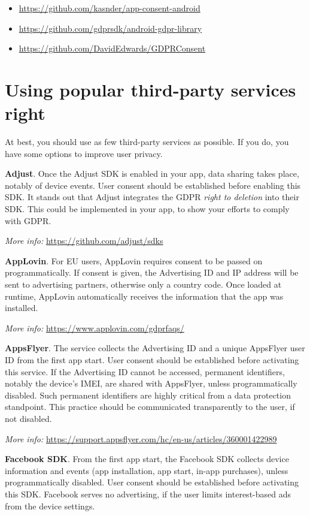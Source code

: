 \documentclass[
]{book}
\providecommand{\tightlist}{%
  \setlength{\itemsep}{0pt}\setlength{\parskip}{0pt}}
\begin{document}
\begin{itemize}
\tightlist
\item
  \url{https://github.com/kasnder/app-consent-android}
\item
  \url{https://github.com/gdprsdk/android-gdpr-library}
\item
  \url{https://github.com/DavidEdwards/GDPRConsent}
\end{itemize}

\hypertarget{using-popular-third-party-services-right}{%
\section{Using popular third-party services right}\label{using-popular-third-party-services-right}}

At best, you should use as few third-party services as possible. If you do, you have some options to improve user privacy.

\textbf{Adjust}. Once the Adjust SDK is enabled in your app, data sharing takes place, notably of device events. User consent should be established before enabling this SDK. It stands out that Adjust integrates the GDPR \emph{right to deletion} into their SDK. This could be implemented in your app, to show your efforts to comply with GDPR.

\emph{More info:} \url{https://github.com/adjust/sdks}

\textbf{AppLovin}. For EU users, AppLovin requires consent to be passed on programmatically. If consent is given, the Advertising ID and IP address will be sent to advertising partners, otherwise only a country code. Once loaded at runtime, AppLovin automatically receives the information that the app was installed.

\emph{More info:} \url{https://www.applovin.com/gdprfaqs/}

\textbf{AppsFlyer}. The service collects the Advertising ID and a unique AppsFlyer user ID from the first app start. User consent should be established before activating this service. If the Advertising ID cannot be accessed, permanent identifiers, notably the device's IMEI, are shared with AppsFlyer, unless programmatically disabled. Such permanent identifiers are highly critical from a data protection standpoint. This practice should be communicated transparently to the user, if not disabled.

\emph{More info:} \url{https://support.appsflyer.com/hc/en-us/articles/360001422989}

\textbf{Facebook SDK}. From the first app start, the Facebook SDK collects device information and events (app installation, app start, in-app purchases), unless programmatically disabled. User consent should be established before activating this SDK. Facebook serves no advertising, if the user limits interest-based ads from the device settings.
\end{document}
